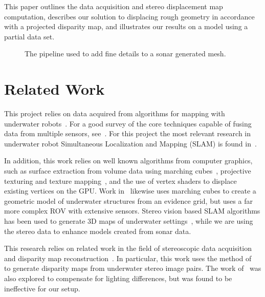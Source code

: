 \documentclass{llncs}
\begin{document}
This paper outlines the data acquisition and stereo displacement map computation, describes our solution to displacing rough geometry in accordance with a projected disparity map, and illustrates our results on a model using a partial  data set.
%
\begin{figure*}[!ht]
  \vspace{-0.2cm}
  \caption{The pipeline used to add fine details to a sonar generated mesh.}
 \label{fig:systemblock}
\end{figure*}
%
\vspace{-25pt}
\section{Related Work}
\label{sec:related_work}
\noindent This project relies on data acquired from algorithms for mapping with underwater robots~\cite{Williams09,opizarro-2009a,Fairfield2006,Clark2008b}. For a good survey of the core techniques capable of fusing data from multiple sensors, see~\cite{Thrun2005}.
For this project the most relevant  research in underwater robot Simultaneous Localization and Mapping (SLAM) is found in~\cite{Williams2000,harbor,Fairfield2005,Fairfield2006}.

In addition, this work relies on well known algorithms from computer graphics, such as surface extraction from volume data using marching cubes~\cite{Lorensen}, projective texturing and texture mapping~\cite{Williams78castingcurved,Segal}, and the use of vertex shaders to displace existing vertices on the GPU. Work in~\cite{Fairfield:2010} likewise uses marching cubes to create a geometric model of underwater structures from an evidence grid, but uses a far more complex ROV with extensive sensors.
Stereo vision based SLAM algorithms has been used to generate 3D maps of underwater settings~\cite{Mahon:2011,stereo:Roberson,stereo:Aqua}, while we are using the stereo data to enhance models created from sonar data.

This research relies on related work in the field of stereoscopic data acquisition and disparity map reconstruction~\cite{stereo:scharsteinSzeliski}.
In particular, this work uses the method of~\cite{stereo:zitKan} to generate disparity maps from underwater stereo image pairs.
The work of~\cite{stereo:nalGast} was also explored to compensate for lighting differences, but was found to be ineffective for our setup. 
\vspace{-11pt}
\end{document}
